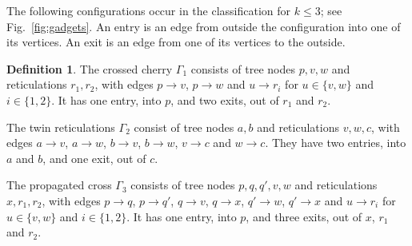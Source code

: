 \documentclass[11pt,a4paper]{article}
\theoremstyle{definition}
\newtheorem{definition}[theorem]{Definition}
\begin{document}
The following configurations occur in the classification for $k\le3$; see Fig.~\ref{fig:gadgets}. An entry is an edge from outside the configuration into one of its vertices. An exit is an edge from one of its vertices to the outside.

\begin{definition}\label{def:gadgets}
The crossed cherry $\Gamma_1$ consists of tree nodes $p,v,w$ and reticulations $r_1,r_2$, with edges $p\to v$, $p\to w$ and $u\to r_i$ for $u\in\{v,w\}$ and $i\in\{1,2\}$. It has one entry, into $p$, and two exits, out of $r_1$ and $r_2$.

The twin reticulations $\Gamma_2$ consist of tree nodes $a,b$ and reticulations $v,w,c$, with edges $a\to v$, $a\to w$, $b\to v$, $b\to w$, $v\to c$ and $w\to c$. They have two entries, into $a$ and $b$, and one exit, out of $c$.

The propagated cross $\Gamma_3$ consists of tree nodes $p,q,q',v,w$ and reticulations $x,r_1,r_2$, with edges $p\to q$, $p\to q'$, $q\to v$, $q\to x$, $q'\to w$, $q'\to x$ and $u\to r_i$ for $u\in\{v,w\}$ and $i\in\{1,2\}$. It has one entry, into $p$, and three exits, out of $x$, $r_1$ and $r_2$.
\end{definition}
\end{document}

